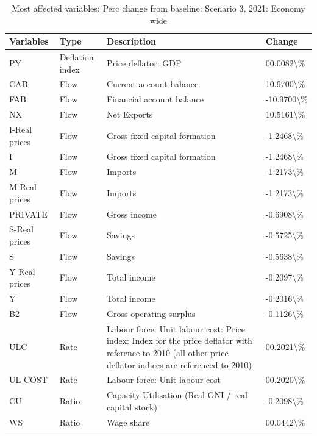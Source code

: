 \documentclass[
]{book}
\begin{document}
\begin{table}

\caption{\label{tab:most-affected-Scenario-3-perc-economy}Most affected variables: Perc change from baseline: Scenario 3, 2021: Economy wide}
\centering
\fontsize{10}{12}\selectfont
\begin{tabular}[t]{l|l|l|l}
\hline
Variables & Type & Description & Change\\
\hline
PY & Deflation index & Price deflator: GDP & 00.0082\textbackslash{}\%\\
\hline
CAB & Flow & Current account balance & 10.9700\textbackslash{}\%\\
\hline
FAB & Flow & Financial account balance & -10.9700\textbackslash{}\%\\
\hline
NX & Flow & Net Exports & 10.5161\textbackslash{}\%\\
\hline
I-Real prices & Flow & Gross fixed capital formation & -1.2468\textbackslash{}\%\\
\hline
I & Flow & Gross fixed capital formation & -1.2468\textbackslash{}\%\\
\hline
M & Flow & Imports & -1.2173\textbackslash{}\%\\
\hline
M-Real prices & Flow & Imports & -1.2173\textbackslash{}\%\\
\hline
PRIVATE & Flow & Gross income & -0.6908\textbackslash{}\%\\
\hline
S-Real prices & Flow & Savings & -0.5725\textbackslash{}\%\\
\hline
S & Flow & Savings & -0.5638\textbackslash{}\%\\
\hline
Y-Real prices & Flow & Total income & -0.2097\textbackslash{}\%\\
\hline
Y & Flow & Total income & -0.2016\textbackslash{}\%\\
\hline
B2 & Flow & Gross operating surplus & -0.1126\textbackslash{}\%\\
\hline
ULC & Rate & Labour force: Unit labour cost: Price index: Index for the price deflator with reference to 2010 (all other price deflator indices are referenced to 2010) & 00.2021\textbackslash{}\%\\
\hline
UL-COST & Rate & Labour force: Unit labour cost & 00.2020\textbackslash{}\%\\
\hline
CU & Ratio & Capacity Utilisation (Real GNI  /  real capital stock) & -0.2098\textbackslash{}\%\\
\hline
WS & Ratio & Wage share & 00.0442\textbackslash{}\%\\
\hline
\end{tabular}
\end{table}
\end{document}
